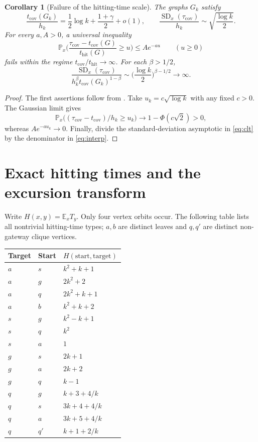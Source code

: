 \documentclass[11pt]{amsart}
\newtheorem{corollary}[theorem]{Corollary}
\theoremstyle{remark}
\numberwithin{equation}{section}
\DeclareMathOperator{\SD}{SD}
\newcommand{\E}{\mathbb{E}}
\newcommand{\Prob}{\mathbb{P}}
\newcommand{\tcov}{t_{\mathrm{cov}}}
\newcommand{\thit}{t_{\mathrm{hit}}}
\newcommand{\taucov}{\tau_{\mathrm{cov}}}
\begin{document}
\begin{corollary}[Failure of the hitting-time scale]\label{cor:failure}
The graphs $G_k$ satisfy
\[
\frac{\tcov(G_k)}{h_k}=\frac12\log k+\frac{1+\gamma}{2}+o(1),\qquad \frac{\SD_x(\taucov)}{h_k}\sim\sqrt{\frac{\log k}{2}}.
\]
For every $a,A>0$, a universal inequality
\[
\Prob_x\Big(\frac{\taucov-\tcov(G)}{\thit(G)}\ge u\Big)\le Ae^{-au}\qquad(u\ge 0)
\]
fails within the regime $\tcov/\thit\to\infty$. For each $\beta>1/2$,
\begin{equation}\label{eq:interp}
\frac{\SD_x(\taucov)}{h_k^{\beta}\tcov(G_k)^{1-\beta}}\sim\Big(\frac{\log k}{2}\Big)^{\beta-1/2}\longrightarrow\infty.
\end{equation}
\end{corollary}

\begin{proof}
The first assertions follow from . Take $u_k=c\sqrt{\log k}$ with any fixed $c>0$. The Gaussian limit gives
\[
\Prob_x\big((\taucov-\tcov)/h_k\ge u_k\big)\longrightarrow 1-\Phi(c\sqrt2)>0,
\]
whereas $Ae^{-au_k}\to 0$. Finally, divide the standard-deviation asymptotic in \eqref{eq:clt} by the denominator in \eqref{eq:interp}.
\end{proof}

\section{Exact hitting times and the excursion transform}\label{sec:hitting}

Write $H(x,y)=\E_xT_y$. Only four vertex orbits occur. The following table lists all nontrivial hitting-time types; $a,b$ are distinct leaves and $q,q'$ are distinct non-gateway clique vertices.
\begin{center}
\begin{tabular}{lll}
\toprule
Target & Start & $H(\text{start},\text{target})$\\
\midrule
$a$ & $s$ & $k^2+k+1$\\
$a$ & $g$ & $2k^2+2$\\
$a$ & $q$ & $2k^2+k+1$\\
$a$ & $b$ & $k^2+k+2$\\
\midrule
$s$ & $g$ & $k^2-k+1$\\
$s$ & $q$ & $k^2$\\
$s$ & $a$ & $1$\\
\midrule
$g$ & $s$ & $2k+1$\\
$g$ & $a$ & $2k+2$\\
$g$ & $q$ & $k-1$\\
\midrule
$q$ & $g$ & $k+3+4/k$\\
$q$ & $s$ & $3k+4+4/k$\\
$q$ & $a$ & $3k+5+4/k$\\
$q$ & $q'$ & $k+1+2/k$\\
\bottomrule
\end{tabular}
\end{center}
\end{document}
